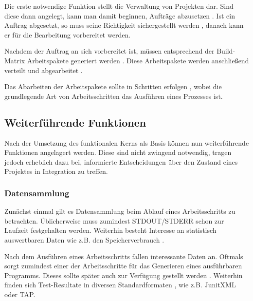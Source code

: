 Die erste notwendige Funktion stellt die Verwaltung von Projekten  dar.
Sind diese dann angelegt, kann man damit beginnen, Aufträge abzusetzen .
Ist ein Auftrag abgesetzt, so muss seine Richtigkeit sichergestellt werden ,
danach kann er für die Bearbeitung  vorbereitet werden.

Nachdem der Auftrag an sich vorbereitet ist, müssen entsprechend der Build-Matrix 
Arbeitspakete generiert werden .
Diese Arbeitspakete werden anschließend verteilt  und abgearbeitet .

Das Abarbeiten der Arbeitspakete sollte in Schritten erfolgen ,
wobei die grundlegende Art von Arbeitsschritten das Ausführen eines Prozesses  ist.


\subsection{Weiterführende Funktionen}

Nach der Umsetzung des funktionalen Kerns als Basis
k\"onnen nun weiterf\"uhrende Funktionen angelagert werden.
Diese sind nicht zwingend notwendig, tragen jedoch erheblich dazu bei,
informierte Entscheidungen \"uber den Zustand eines Projektes in Integration zu treffen.

\subsubsection{Datensammlung}

Zun\"achst einmal gilt es Datensammlung beim Ablauf eines Arbeitsschritts zu betrachten.
\"Ublicherweise muss zumindest STDOUT/STDERR schon zur Laufzeit festgehalten  werden.
Weiterhin besteht  Interesse an statistisch auswertbaren Daten
wie z.B. den Speicherverbrauch .

Nach dem Ausf\"uhren eines Arbeitsschritts fallen interessante Daten an.
Oftmals sorgt zumindest einer der Arbeitsschritte für das Generieren eines ausführbaren Programms.
Dieses sollte sp\"ater auch zur Verf\"ugung gestellt werden .
Weiterhin finden sich Test-Resultate in diversen Standardformaten ,
wie z.B. JunitXML \cite{jenkins:junitxml} oder \ac{TAP}.

